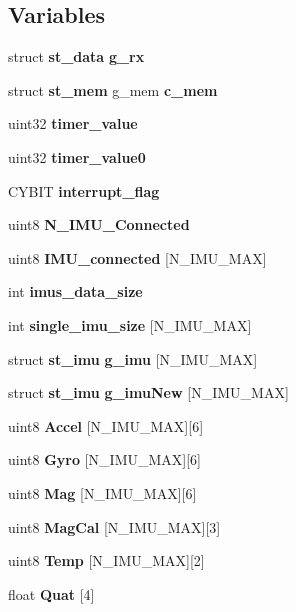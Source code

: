 \subsection*{Variables}
\begin{DoxyCompactItemize}
\item 
\mbox{\label{globals_8h_aa963ce8fafc11e104eb7ee22982d0345}} 
struct \textbf{ st\+\_\+data} {\bfseries g\+\_\+rx}
\item 
\mbox{\label{globals_8h_a44c3cbd8e234e0816f0334e29646a800}} 
struct \textbf{ st\+\_\+mem} g\+\_\+mem {\bfseries c\+\_\+mem}
\item 
\mbox{\label{globals_8h_ad47cd0e4d0fcf5739a88e52e949a8084}} 
uint32 {\bfseries timer\+\_\+value}
\item 
\mbox{\label{globals_8h_a9bab7f1b1cf2ba38d5968eee42644c32}} 
uint32 {\bfseries timer\+\_\+value0}
\item 
\mbox{\label{globals_8h_a1e6fda88dfdabc63859f8907eb702920}} 
C\+Y\+B\+IT {\bfseries interrupt\+\_\+flag}
\item 
\mbox{\label{globals_8h_a47118db87acd24ae6dac18b036f360ec}} 
uint8 {\bfseries N\+\_\+\+I\+M\+U\+\_\+\+Connected}
\item 
\mbox{\label{globals_8h_a99668f3210aba0be3baec19486621bce}} 
uint8 {\bfseries I\+M\+U\+\_\+connected} [N\+\_\+\+I\+M\+U\+\_\+\+M\+AX]
\item 
\mbox{\label{globals_8h_a86272fcfcab512d38a11824196df4bbc}} 
int {\bfseries imus\+\_\+data\+\_\+size}
\item 
\mbox{\label{globals_8h_aca96c483c3e269e3805aa861ced0aef5}} 
int {\bfseries single\+\_\+imu\+\_\+size} [N\+\_\+\+I\+M\+U\+\_\+\+M\+AX]
\item 
\mbox{\label{globals_8h_a86bb710944c248adeda63ded90db872a}} 
struct \textbf{ st\+\_\+imu} {\bfseries g\+\_\+imu} [N\+\_\+\+I\+M\+U\+\_\+\+M\+AX]
\item 
\mbox{\label{globals_8h_a9fa446daf1b4e3d6cc394fdc88e0ff63}} 
struct \textbf{ st\+\_\+imu} {\bfseries g\+\_\+imu\+New} [N\+\_\+\+I\+M\+U\+\_\+\+M\+AX]
\item 
\mbox{\label{globals_8h_a187c605f3898cf11e09f6f469c265920}} 
uint8 {\bfseries Accel} [N\+\_\+\+I\+M\+U\+\_\+\+M\+AX][6]
\item 
\mbox{\label{globals_8h_a49dba88a31d1b3b4190065b9ef1649fe}} 
uint8 {\bfseries Gyro} [N\+\_\+\+I\+M\+U\+\_\+\+M\+AX][6]
\item 
\mbox{\label{globals_8h_a5d88408ccb73729f049a52b4d1daaadf}} 
uint8 {\bfseries Mag} [N\+\_\+\+I\+M\+U\+\_\+\+M\+AX][6]
\item 
\mbox{\label{globals_8h_a1e598e1bdae5fe927fbd1f396161f3a6}} 
uint8 {\bfseries Mag\+Cal} [N\+\_\+\+I\+M\+U\+\_\+\+M\+AX][3]
\item 
\mbox{\label{globals_8h_af5f2d49e123a057d358297a34194ebdc}} 
uint8 {\bfseries Temp} [N\+\_\+\+I\+M\+U\+\_\+\+M\+AX][2]
\item 
\mbox{\label{globals_8h_ac0c4d3f055f976340a0e604e58b95a8a}} 
float {\bfseries Quat} [4]
\end{DoxyCompactItemize}


